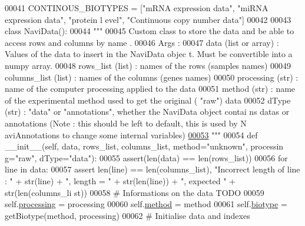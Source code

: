 \begin{DoxyCode}
00041 CONTINOUS\_BIOTYPES = [\textcolor{stringliteral}{"mRNA expression data"}, \textcolor{stringliteral}{"miRNA expression data"}, \textcolor{stringliteral}{"protein l
      evel"}, \textcolor{stringliteral}{"Continuous copy number data"}]
00042 
00043 \textcolor{keyword}{class }NaviData():
00044     \textcolor{stringliteral}{"""}
00045 \textcolor{stringliteral}{    Custom class to store the data and be able to access rows and columns by name
      .}
00046 \textcolor{stringliteral}{    Args :}
00047 \textcolor{stringliteral}{        data (list or array) : Values of the data to insert in the NaviData objec
      t. Must be convertible into a numpy array.}
00048 \textcolor{stringliteral}{        rows\_list (list) : names of the rows (samples names)}
00049 \textcolor{stringliteral}{        columns\_list (list) : names of the columns (genes names)}
00050 \textcolor{stringliteral}{        processing (str) : name of the computer processing applied to the data}
00051 \textcolor{stringliteral}{        method (str) : name of the experimental method used to get the original (
      "raw") data}
00052 \textcolor{stringliteral}{        dType (str) : "data" or "annotations", whether the NaviData object contai
      ns datas or annotations (Note : this should be left to default, this is used by N
      aviAnnotations to change some internal variables)}
\hypertarget{navidata_8py_source_l00053}{}\hyperlink{classnavicom_1_1navidata_1_1NaviData}{00053} \textcolor{stringliteral}{    """}
00054     \textcolor{keyword}{def }\_\_init\_\_(self, data, rows\_list, columns\_list, method="unknown", processin
      g="raw", dType="data"):
00055         \textcolor{keyword}{assert}(len(data) == len(rows\_list))
00056         \textcolor{keywordflow}{for} line \textcolor{keywordflow}{in} data:
00057             \textcolor{keyword}{assert} len(line) == len(columns\_list), \textcolor{stringliteral}{"Incorrect length of line : "} 
      + str(line) + \textcolor{stringliteral}{", length = "} + str(len(line)) + \textcolor{stringliteral}{", expected "} + str(len(columns\_li
      st))
00058         \textcolor{comment}{# Informations on the data TODO}
00059         self.\hyperlink{classnavicom_1_1navidata_1_1NaviData_ab3f30d76377459fe539f440df162ea59}{processing} = processing
00060         self.\hyperlink{classnavicom_1_1navidata_1_1NaviData_ae8f909ed788b49a3c894251957e2f732}{method} = method
00061         self.\hyperlink{classnavicom_1_1navidata_1_1NaviData_a863ac9998d2facd5f86bcea9b6256003}{biotype} = getBiotype(method, processing)
00062         \textcolor{comment}{# Initialise data and indexes}

\end{DoxyCode}
